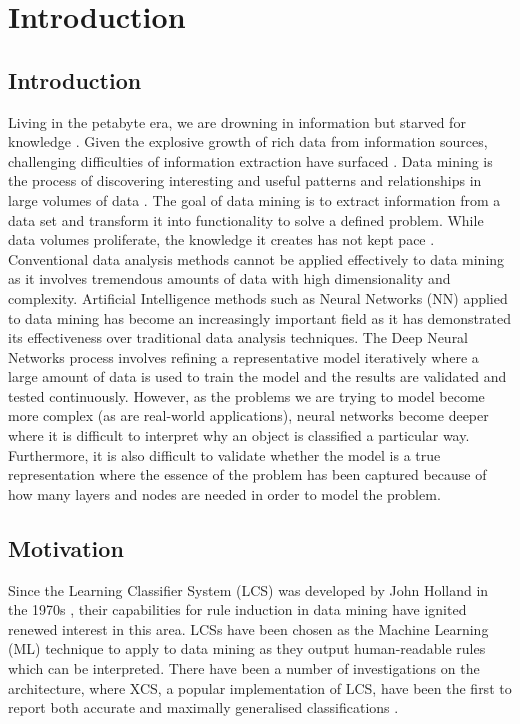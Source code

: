 \chapter{Introduction}
\section{Introduction}
Living in the petabyte era, we are drowning in information but starved for knowledge \cite{naisbitt1984megatrends}. Given the explosive growth of rich data from information sources, challenging difficulties of information extraction have surfaced \cite{bigdata2011}. Data mining is the process of discovering interesting and useful patterns and relationships in large volumes of data \cite{Datamini0:online}. The goal of data mining is to extract information from a data set and transform it into  functionality to solve a defined problem. While data volumes proliferate, the knowledge it creates has not kept pace \cite{bigdata2011}. Conventional data analysis methods cannot be applied effectively to data mining as it involves tremendous amounts of data with high dimensionality and complexity. Artificial Intelligence methods such as Neural Networks (NN) applied to data mining has become an increasingly important field as it has demonstrated its effectiveness over traditional data analysis techniques. The Deep Neural Networks process involves refining a representative model iteratively where a large amount of data is used to train the model and the results are validated and tested continuously. However, as the problems we are trying to model become more complex (as are real-world applications), neural networks become deeper where it is difficult to interpret why an object is classified a particular way. Furthermore, it is also difficult to validate whether the model is a true representation where the essence of the problem has been captured because of how many layers and nodes are needed in order to model the problem. 

\section{Motivation}

Since the Learning Classifier System (LCS) was developed by John Holland in the 1970s \cite{Holl75}, their capabilities for rule induction in data mining have ignited renewed interest in this area. LCSs have been chosen as the Machine Learning (ML) technique to apply to data mining as they output human-readable rules which can be interpreted. There have been a number of investigations on the architecture, where XCS, a popular implementation of LCS, have been the first to report both accurate and maximally generalised classifications \cite{bernado2003accuracy}. 

